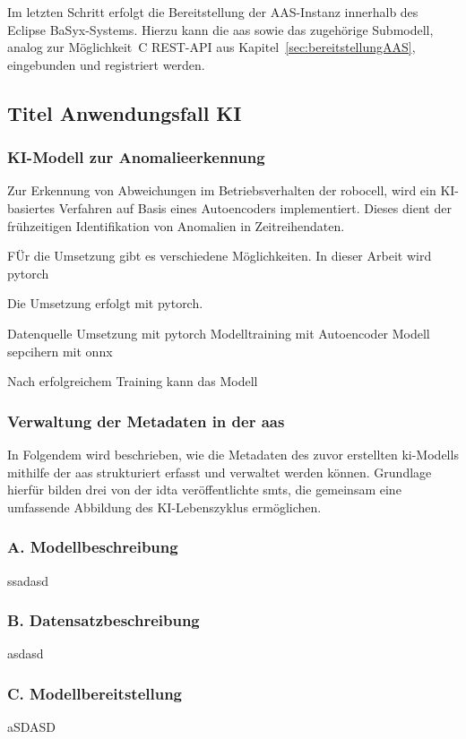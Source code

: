 Im letzten Schritt erfolgt die Bereitstellung der AAS-Instanz innerhalb des Eclipse BaSyx-Systems. 
Hierzu kann die \acs{aas} sowie das zugehörige Submodell, analog zur Möglichkeit~C REST-API aus Kapitel~\ref{sec:bereitstellungAAS}, eingebunden und registriert werden.

\subsection{Titel Anwendungsfall KI}

\subsubsection{KI-Modell zur Anomalieerkennung}
Zur Erkennung von Abweichungen im Betriebsverhalten der robocell, wird ein KI-basiertes Verfahren auf Basis eines Autoencoders implementiert.
Dieses dient der frühzeitigen Identifikation von Anomalien in Zeitreihendaten.


FÜr die Umsetzung gibt es verschiedene Möglichkeiten. In dieser Arbeit wird pytorch 




Die Umsetzung erfolgt mit pytorch.




Datenquelle
Umsetzung mit pytorch
Modelltraining mit Autoencoder
Modell sepcihern mit onnx

Nach erfolgreichem Training kann das Modell 

\subsubsection{Verwaltung der Metadaten in der \acs{aas}}
In Folgendem wird beschrieben, wie die Metadaten des zuvor erstellten \acs{ki}-Modells mithilfe der \acs{aas} strukturiert erfasst und verwaltet werden können. 
Grundlage hierfür bilden drei von der \acs{idta} veröffentlichte \acsp{smt}, die gemeinsam eine umfassende Abbildung des KI-Lebenszyklus ermöglichen.

\subsubsection*{A. Modellbeschreibung}
ssadasd
\subsubsection*{B. Datensatzbeschreibung}
asdasd
\subsubsection*{C. Modellbereitstellung}
aSDASD